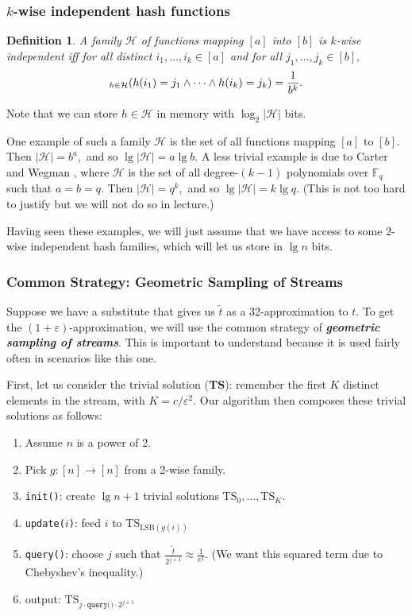 \documentclass[11pt]{article}
\let\Pr\relax
\DeclareMathOperator*{\Pr}{\mathbb{P}}
\newcommand{\eps}{\varepsilon}
\newtheorem{definition}[theorem]{Definition}
\begin{document}
\subsubsection{$k$-wise independent hash functions}

\begin{definition}
A family $\mathcal{H}$ of functions mapping $[a]$ into $[b]$ is \emph{$k$-wise independent} iff for all distinct $i_1, \dots, i_k \in [a]$ and for all $j_1, \dots, j_k \in [b],$ $$\Pr_{h \in \mathcal{H}}(h(i_1) = j_1 \land \cdots \land h(i_k) = j_k) = \frac{1}{b^k}.$$
\end{definition}

Note that we can store $h \in \mathcal{H}$ in memory with $\log_2|\mathcal{H}|$ bits.

One example of such a family $\mathcal{H}$ is the set of all functions mapping $[a]$ to $[b]$. Then $|\mathcal{H}| = b^a,$ and so $\lg|\mathcal{H}| = a \lg b.$ A less trivial example is due to Carter and Wegman \cite{carter1977universal}, where $\mathcal{H}$ is the set of all degree-$(k-1)$ polynomials over $\mathbb{F}_q$ such that $a = b = q.$ Then $|\mathcal{H}| = q^k,$ and so $\lg|\mathcal{H}| = k \lg q.$ (This is not too hard to justify but we will not do so in lecture.)

Having seen these examples, we will just assume that we have access to some 2-wise independent hash families, which will let us store in $\lg n$ bits.

\subsubsection{Common Strategy: Geometric Sampling of Streams} Suppose we have a substitute that gives us $\tilde{t}$ as a 32-approximation to $t.$ To get the $(1+\eps)$-approximation, we will use the common strategy of \textbf{\emph{geometric sampling of streams}}. This is important to understand because it is used fairly often in scenarios like this one.

First, let us consider the trivial solution (\textbf{TS}): remember the first $K$ distinct elements in the stream, with $K = c/\eps^2.$ Our algorithm then composes these trivial solutions as follows:

\begin{enumerate}
\item Assume $n$ is a power of 2.
\item Pick $g : [n] \to [n]$ from a 2-wise family.
\item \texttt{init()}: create $\lg n + 1$ trivial solutions $\mathrm{TS}_0, \dots, \mathrm{TS}_K.$
\item \texttt{update($i$)}: feed $i$ to $\mathrm{TS}_{\mathrm{LSB}(g(i))}$
\item \texttt{query()}: choose $j$ such that $\displaystyle \frac{\tilde{t}}{2^{j+1}} \approx \frac{1}{\epsilon^2}.$ (We want this squared term due to Chebyshev's inequality.)
\item output: $\mathrm{TS}_{j \cdot \texttt{query()} \cdot 2^{j+1}}$
\end{enumerate}
\end{document}
